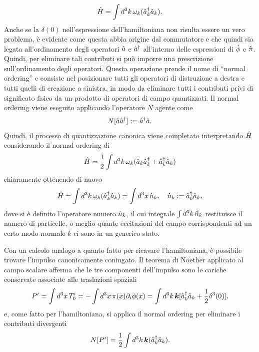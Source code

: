 \begin{equation}
\label{eq: hamiltoniana campo scalare}
    \hat{H} = \int d^3k\,\omega_k(\hat{a}^\dagger_k\hat{a}_k).
\end{equation}
Anche se la $\delta(0)$ nell'espressione dell'hamiltoniana non risulta essere un vero problema, è evidente come questa abbia origine dal commutatore e che quindi sia legata all'ordinamento degli operatori $\hat{a}$ e $\hat{a}^\dagger$ all'interno delle espressioni di $\hat{\phi}$ e $\hat{\pi}$. Quindi, per eliminare tali contributi si può imporre una prescrizione sull'ordinamento degli operatori. Questa operazione prende il nome di ``normal ordering'' e consiste nel posizionare tutti gli operatori di distruzione a destra e tutti quelli di creazione a sinistra, in modo da eliminare tutti i contributi privi di significato fisico da un prodotto di operatori di campo quantizzati. Il normal ordering viene eseguito applicando l'operatore $N$ agente come
\begin{equation}
    N[\hat{a}\hat{a}^\dagger] := \hat{a}^\dagger\hat{a}.
\end{equation}
Quindi, il processo di quantizzazione canonica viene completato interpretando $\hat{H}$ considerando il normal ordering di
\begin{equation}
    \hat{H} = \frac{1}{2}\int d^3k\,\omega_k(\hat{a}_k\hat{a}^\dagger_k + \hat{a}^\dagger_k\hat{a}_k)
\end{equation}
chiaramente ottenendo di nuovo
\begin{equation}
    \hat{H} = \int d^3k\,\omega_k(\hat{a}^\dagger_k\hat{a}_k) = \int d^3x\, \hat{n}_k,\quad \hat{n}_k := \hat{a}^\dagger_k\hat{a}_k,
\end{equation}
dove si è definito l'operatore numero $\hat{n}_k$, il cui integrale $\int d^3k\,\hat{n}_k$ restituisce il numero di particelle, o meglio quante eccitazioni del campo corrispondenti ad un certo modo normale $k$ ci sono in un generico stato.

Con un calcolo analogo a quanto fatto per ricavare l'hamiltoniana, è possibile trovare l'impulso canonicamente coniugato. Il teorema di Noether applicato al campo scalare afferma che le tre componenti dell'impulso sono le cariche conservate associate alle traslazioni spaziali
\begin{equation}
    \begin{split}
        P^i = \int d^3x\,T^i_0 = -\int d^3x\,\pi(x)\partial_i\phi(x) = \int d^3k\,\bm{k}[\hat{a}^\dagger_k\hat{a}_k + \frac{1}{2}\delta^3(0)],
    \end{split}
\end{equation}
e, come fatto per l'hamiltoniana, si applica il normal ordering per eliminare i contributi divergenti
\begin{equation}
    N[P^i] = \frac{1}{2}\int d^3k\,\bm{k}(\hat{a}^\dagger_k\hat{a}_k).
\end{equation}

